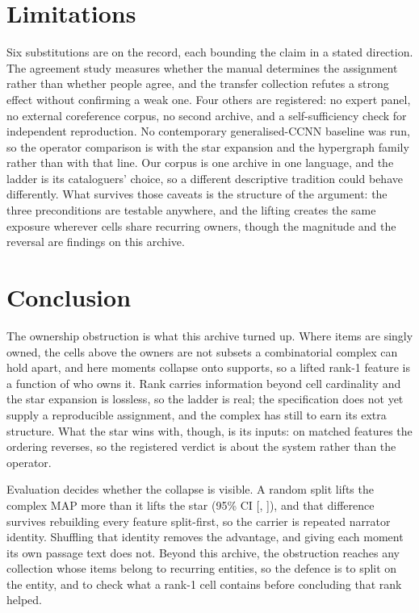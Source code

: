 \documentclass[conference]{IEEEtran}
\begin{document}
\section{Limitations}

Six substitutions are on the record, each bounding the claim in a stated direction. The
agreement study measures whether the manual determines the assignment rather than whether
people agree, and the transfer collection refutes a strong effect without confirming a weak
one. Four others are registered: no expert panel, no external coreference corpus, no second
archive, and a self-sufficiency check for independent reproduction. No contemporary
generalised-CCNN baseline was run, so the operator comparison is with the star expansion and
the hypergraph family rather than with that line. Our corpus is one archive
in one language, and the ladder is its cataloguers' choice, so a different descriptive
tradition could behave differently. What survives those caveats is the structure of the
argument: the three preconditions are testable anywhere, and the lifting creates the same
exposure wherever cells share recurring owners, though the magnitude and the reversal are
findings on this archive.

\section{Conclusion}

The ownership obstruction is what this archive turned up. Where items are singly owned, the
cells above the owners are not subsets a combinatorial complex can hold apart, and here
\obsCells{} moments collapse onto \obsDistinct{} supports, so a lifted rank-1 feature is a
function of who owns it. Rank carries information beyond cell cardinality and the star
expansion is lossless, so the ladder is real; the specification does not yet supply a
reproducible assignment, and the complex has still to earn its extra structure. What the star
wins with, though, is its inputs: on matched features the ordering reverses, so the
registered verdict is about the system rather than the operator.

Evaluation decides whether the collapse is visible. A random split lifts the complex
\didPoint{} MAP more than it lifts the star (95\% CI [\didLo{}, \didHi{}]), and that
difference survives rebuilding every feature split-first, so the carrier is repeated narrator
identity. Shuffling that identity removes the advantage, and giving each moment its own
passage text does not. Beyond this archive, the obstruction reaches any collection whose
items belong to recurring
entities, so the defence is to split on the entity, and to check what a rank-1 cell contains
before concluding that rank helped.



\end{document}
